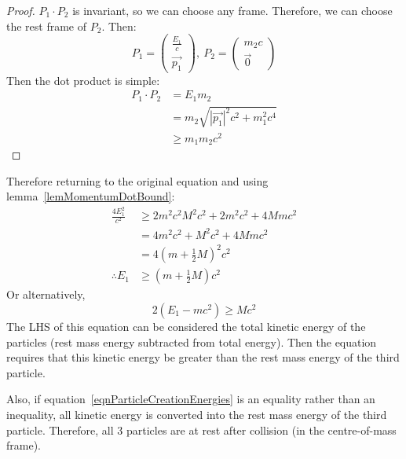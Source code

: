 \documentclass[../Main.tex]{subfiles}
\begin{document}
\begin{proof}
    $P_1 \cdot P_2$ is invariant, so we can choose any frame. Therefore, we can choose the rest frame of $P_2$. Then:
    \begin{equation*}
        P_1 = \begin{pmatrix}\frac{E_1}{c} \\ \vec{p_1}\end{pmatrix},~P_2 = \begin{pmatrix}m_2 c \\ \vec{0}\end{pmatrix}
    \end{equation*}
    Then the dot product is simple:
    \begin{align*}
        P_1 \cdot P_2 &= E_1 m_2 \\
        &= m_2 \sqrt{|\vec{p_1}|^2 c^2 + m_1^2 c^4} \\
        &\geq m_1 m_2 c^2
    \end{align*}
\end{proof}
Therefore returning to the original equation and using lemma~\ref{lemMomentumDotBound}:
\begin{align*}
    \frac{4E_1^2}{c^2} &\geq 2m^2 c^2 M^2 c^2 + 2m^2 c^2 + 4Mm c^2 \\
    &= 4m^2 c^2 + M^2 c^2 + 4Mm c^2 \\
    &= 4\left(m + \frac{1}{2} M\right)^2 c^2 \\
    \therefore E_1 &\geq \left(m + \frac{1}{2}M\right) c^2
\end{align*}
Or alternatively,
\begin{equation}
    2\left(E_1 - mc^2\right) \geq Mc^2
    \label{eqnParticleCreationEnergies}
\end{equation}
The LHS of this equation can be considered the total kinetic energy of the particles (rest mass energy subtracted from total energy). Then the equation requires that this kinetic energy be greater than the rest mass energy of the third particle.

Also, if equation~\ref{eqnParticleCreationEnergies} is an equality rather than an inequality, all kinetic energy is converted into the rest mass energy of the third particle. Therefore, all 3 particles are at rest after collision (in the centre-of-mass frame).
\end{document}
